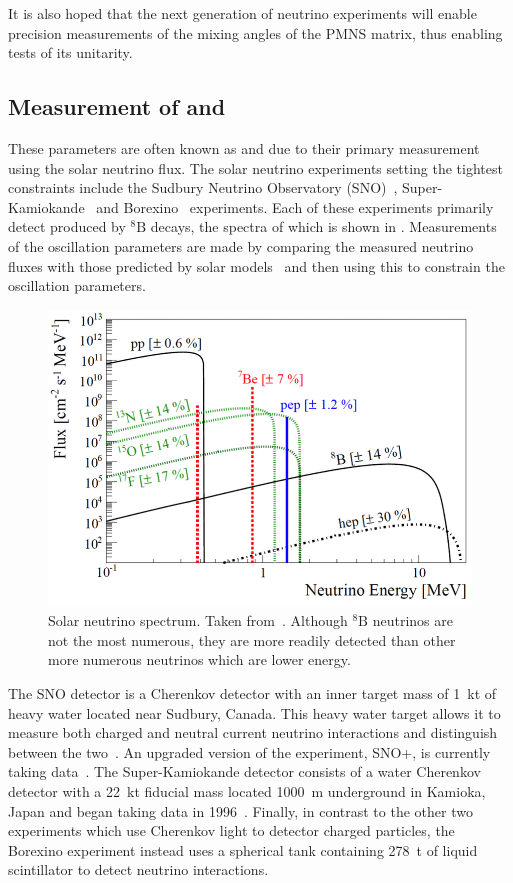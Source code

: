 It is also hoped that the next generation of neutrino experiments will enable precision measurements of the mixing angles of the PMNS matrix, thus enabling tests of its unitarity.

\subsection{Measurement of  and }
\label{sec:theory:currentState:solar}

These parameters are often known as  and  due to their primary measurement using the solar neutrino flux.
The solar neutrino experiments setting the tightest constraints include the Sudbury Neutrino Observatory (SNO)~\cite{snoCombined}, Super-Kamiokande~\cite{superKReview} and Borexino~\cite{borexino} experiments.
Each of these experiments primarily detect \nue produced by $^{8}\text{B}$ decays, the spectra of which is shown in .
Measurements of the oscillation parameters are made by comparing the measured neutrino fluxes with those predicted by solar models~\cite{solarModel} and then using this to constrain the oscillation parameters.

\begin{figure}[h]
  \centering
  \includegraphics[width=.7\linewidth]{files/figures/theory/solarNeutrinoSpectrum}
  \caption[Solar neutrino spectrum.]{Solar neutrino spectrum. Taken from~\cite{solarNuFluxes}. Although $^{8}\text{B}$ neutrinos are not the most numerous, they are more readily detected than other more numerous neutrinos which are lower energy.}
  \label{fig:solarNuFluxes}
\end{figure}

The SNO detector is a Cherenkov detector with an inner target mass of 1~kt of heavy water located near Sudbury, Canada.
This heavy water target allows it to measure both charged and neutral current neutrino interactions and distinguish between the two~\cite{snoCombined}. An upgraded version of the experiment, SNO+, is currently taking data~\cite{snoPlus}. 
The Super-Kamiokande detector consists of a water Cherenkov detector with a 22~kt fiducial mass located 1000~m underground in Kamioka, Japan and began taking data in 1996~\cite{superKReview}.
Finally, in contrast to the other two experiments which use Cherenkov light to detector charged particles, the Borexino experiment instead uses a spherical tank containing 278~t of liquid scintillator to detect neutrino interactions.


